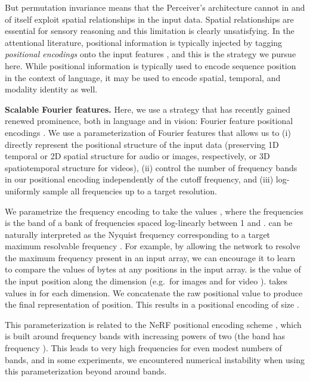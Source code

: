\documentclass{article}
\begin{document}
But permutation invariance means that the Perceiver's architecture cannot in and of itself exploit spatial relationships in the input data. Spatial relationships are essential for sensory reasoning \cite{kant1781critique} and this limitation is clearly unsatisfying. In the attentional literature, positional information is typically injected by tagging \textit{positional encodings} onto the input features \cite{vaswani2017attention}, and this is the strategy we pursue here. While positional information is typically used to encode sequence position in the context of language, it may be used to encode spatial, temporal, and modality identity as well.

\noindent \textbf{Scalable Fourier features.} Here, we use a strategy that has recently gained renewed prominence, both in language and in vision: Fourier feature positional encodings \cite{stanley2007compositional, vaswani2017attention, parmar2018image, tancik2020fourier, mildenhall2020nerf}. We use a parameterization of Fourier features that allows us to (i) directly represent the positional structure of the input data (preserving 1D temporal or 2D spatial structure for audio or images, respectively, or 3D spatiotemporal structure for videos), (ii) control the number of frequency bands in our positional encoding independently of the cutoff frequency, and (iii) log-uniformly sample all frequencies up to a target resolution. 

We parametrize the frequency encoding to take the values , where the frequencies  is the  band of a bank of frequencies spaced log-linearly between 1 and .  can be naturally interpreted as the Nyquist frequency \citep{nyquist1928certain} corresponding to a target maximum resolvable frequency . For example, by allowing the network to resolve the maximum frequency present in an input array, we can encourage it to learn to compare the values of bytes at any positions in the input array.  is the value of the input position along the  dimension (e.g.\ for images  and for video ).  takes values in  for each dimension. We concatenate the raw positional value  to produce the final representation of position. This results in a positional encoding of size .

This parameterization is related to the NeRF positional encoding scheme \cite{mildenhall2020nerf}, which is built around frequency bands with increasing powers of two (the  band has frequency ). This leads to very high frequencies for even modest numbers of bands, and in some experiments, we encountered numerical instability when using this parameterization beyond around  bands. 
\end{document}
